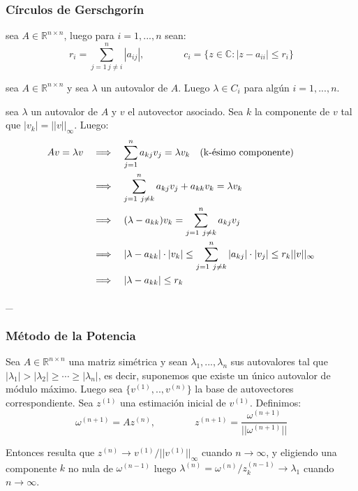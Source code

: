 \hypertarget{cuxedrculos-de-gerschgoruxedn}{%
\subsubsection{Círculos de
Gerschgorín}\label{cuxedrculos-de-gerschgoruxedn}}

\Definicion sea \(A \in \ensuremath{\mathbb{R}}^{n \times n}\), luego
para \(i=1,...,n\) sean: \[ 
r_i = \sum_{j=1\  j\neq i}^n |a_{ij}|,
\qquad \qquad c_i = \{z \in \mathbb{C} : |z - a_{ii}| \leq r_i\} 
\]

\Teorema sea \(A \in \ensuremath{\mathbb{R}}^{n \times n}\) y sea
\(\lambda\) un autovalor de \(A\). Luego \(\lambda \in C_i\) para algún
\(i=1,...,n\).

\Demostracion sea \(\lambda\) un autovalor de \(A\) y \(v\) el
autovector asociado. Sea \(k\) la componente de \(v\) tal que
\(|v_k| = ||v||_{\infty}\). Luego: \begin{align*}
A v = \lambda v 
& \quad\Longrightarrow\quad \sum_{j=1}^n a_{kj} v_j 
= \lambda v_k \quad \text{(k-ésimo componente)} \\
& \quad\Longrightarrow\quad \sum_{j=1\ j \neq k}^n a_{kj} v_j + a_{kk} v_k 
= \lambda v_k \\
& \quad\Longrightarrow\quad (\lambda - a_{kk}) v_k 
= \sum_{j=1\ j\neq k}^n a_{kj} v_j \\
& \quad\Longrightarrow\quad |\lambda - a_{kk}| \cdot |v_k| \leq
\sum_{j=1\ j\neq k}^n |a_{kj}| \cdot |v_j|
\leq r_k ||v||_{\infty} \\
& \quad\Longrightarrow\quad |\lambda - a_{kk}| \leq r_k
\end{align*}


\_

\hypertarget{muxe9todo-de-la-potencia}{%
\subsubsection{Método de la Potencia}\label{muxe9todo-de-la-potencia}}

Sea \(A \in \ensuremath{\mathbb{R}}^{n \times n}\) una matriz simétrica
y sean \(\lambda_1,...,\lambda_n\) sus autovalores tal que
\(|\lambda_1| > |\lambda_2| \geq \cdots \geq |\lambda_n|\), es decir,
suponemos que existe un único autovalor de módulo máximo. Luego sea
\(\{v^{(1)},..,v^{(n)}\}\) la base de autovectores correspondiente. Sea
\(z^{(1)}\) una estimación inicial de \(v^{(1)}\). Definimos: \[
\omega^{(n+1)} = A z^{(n)},
\qquad\qquad z^{(n+1)} = \frac{\omega^{(n+1)}}{|| \omega^{(n+1)} ||}
\]

Entonces resulta que
\(z^{(n)} \rightarrow v^{(1)} / ||v^{(1)}||_{\infty}\) cuando
\(n \rightarrow \infty\), y eligiendo una componente \(k\) no nula de
\(\omega^{(n-1)}\) luego
\(\lambda^{(n)} = \omega^{(n)} / z_k^{(n-1)} \rightarrow \lambda_1\)
cuando \(n \rightarrow \infty\).

